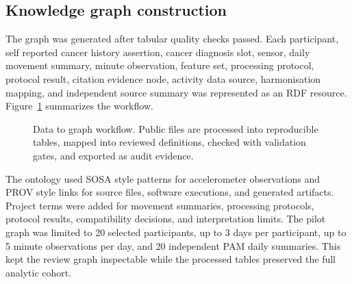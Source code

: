 \documentclass[final,5p,times,twocolumn]{elsarticle}
\begin{document}
\subsection{Knowledge graph construction}

The graph was generated after tabular quality checks passed. Each participant, self reported cancer history assertion, cancer diagnosis slot, sensor, daily movement summary, minute observation, feature set, processing protocol, protocol result, citation evidence node, activity data source, harmonisation mapping, and independent source summary was represented as an RDF resource. Figure~\ref{fig:pipeline} summarizes the workflow.

\begin{figure}[t]
\centering
{}
\caption{Data to graph workflow. Public files are processed into reproducible tables, mapped into reviewed definitions, checked with validation gates, and exported as audit evidence.}
\label{fig:pipeline}
\end{figure}

The ontology used SOSA style patterns for accelerometer observations and PROV style links for source files, software executions, and generated artifacts. Project terms were added for movement summaries, processing protocols, protocol results, compatibility decisions, and interpretation limits. The pilot graph was limited to 20 selected participants, up to 3 days per participant, up to 5 minute observations per day, and 20 independent PAM daily summaries. This kept the review graph inspectable while the processed tables preserved the full analytic cohort.
\end{document}
